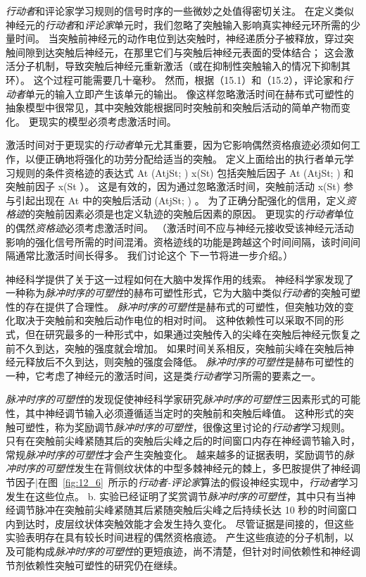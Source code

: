 \textit{行动者}和评论家学习规则的信号时序的一些微妙之处值得密切关注。
在定义类似神经元的\textit{行动者}和\textit{评论家}单元时，我们忽略了突触输入影响真实神经元环所需的少量时间。
当突触前神经元的动作电位到达突触时，神经递质分子被释放，穿过突触间隙到达突触后神经元，在那里它们与突触后神经元表面的受体结合；
这会激活分子机制，导致突触后神经元重新激活（或在抑制性突触输入的情况下抑制其环）。
这个过程可能需要几十毫秒。
然而，根据（15.1）和（15.2），评论家和\textit{行动者}单元的输入立即产生该单元的输出。
像这样忽略激活时间在赫布式可塑性的抽象模型中很常见，其中突触效能根据同时突触前和突触后活动的简单产物而变化。
更现实的模型必须考虑激活时间。


激活时间对于更现实的\textit{行动者}单元尤其重要，因为它影响偶然资格痕迹必须如何工作，以便正确地将强化的功劳分配给适当的突触。 定义上面给出的执行者单元学习规则的条件资格迹的表达式 At (AtjSt; ) x(St) 包括突触后因子 At (AtjSt; ) 和突触前因子 x(St ）。
这是有效的，因为通过忽略激活时间，突触前活动 x(St) 参与引起出现在 At 中的突触后活动 (AtjSt; ) 。
为了正确分配强化的信用，定义\textit{资格迹}的突触前因素必须是也定义轨迹的突触后因素的原因。
更现实的\textit{行动者}单位的偶然\textit{资格迹}必须考虑激活时间。
（激活时间不应与神经元接收受该神经元活动影响的强化信号所需的时间混淆。资格迹线的功能是跨越这个时间间隔，该时间间隔通常比激活时间长得多。
我们讨论这个 下一节将进一步介绍。）


神经科学提供了关于这一过程如何在大脑中发挥作用的线索。
神经科学家发现了一种称为\textit{脉冲时序的可塑性}的赫布可塑性形式，它为大脑中类似\textit{行动者}的突触可塑性的存在提供了合理性。
\textit{脉冲时序的可塑性}是赫布式的可塑性，但突触功效的变化取决于突触前和突触后动作电位的相对时间。
这种依赖性可以采取不同的形式，但在研究最多的一种形式中，如果通过突触传入的尖峰在突触后神经元恢复之前不久到达，突触的强度就会增加。
如果时间关系相反，突触前尖峰在突触后神经元释放后不久到达，则突触的强度会降低。
\textit{脉冲时序的可塑性}是赫布可塑性的一种，它考虑了神经元的激活时间，这是类\textit{行动者}学习所需的要素之一。


\textit{脉冲时序的可塑性}的发现促使神经科学家研究\textit{脉冲时序的可塑性}三因素形式的可能性，其中神经调节输入必须遵循适当定时的突触前和突触后峰值。
这种形式的突触可塑性，称为奖励调节\textit{脉冲时序的可塑性}，很像这里讨论的\textit{行动者}学习规则。
只有在突触前尖峰紧随其后的突触后尖峰之后的时间窗口内存在神经调节输入时，常规\textit{脉冲时序的可塑性}才会产生突触变化。
越来越多的证据表明，奖励调节的\textit{脉冲时序的可塑性}发生在背侧纹状体的中型多棘神经元的棘上，多巴胺提供了神经调节因子|在图~\ref{fig:12_6}~所示的\textit{行动者-评论家}算法的假设神经实现中，\textit{行动者}学习发生在这些位点。
b. 实验已经证明了奖赏调节\textit{脉冲时序的可塑性}，其中只有当神经调节脉冲在突触前尖峰紧随其后紧随突触后尖峰之后持续长达 10 秒的时间窗口内到达时，皮层纹状体突触效能才会发生持久变化\cite{yagishita2014critical}。
尽管证据是间接的，但这些实验表明存在具有较长时间进程的偶然资格痕迹。
产生这些痕迹的分子机制，以及可能构成\textit{脉冲时序的可塑性}的更短痕迹，尚不清楚，但针对时间依赖性和神经调节剂依赖性突触可塑性的研究仍在继续。


